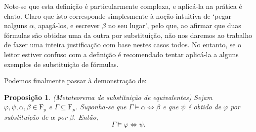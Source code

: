 \documentclass{report}
\newtheorem{prop}{Proposição}
\theoremstyle{definition}
\theoremstyle{remark}
\newcommand{\F}{\mathrm{F}}
\newcommand{\eqv}{\mathbin{\Leftrightarrow}}
\begin{document}
	Note-se que esta definição é particularmente complexa, e aplicá-la na prática é chato. Claro que isto corresponde simplesmente à noção intuitiva de `pegar nalguns $\alpha$, apagá-los, e escrever $\beta$ no seu lugar', pelo que, ao afirmar que duas fórmulas são obtidas uma da outra por substituição, não nos daremos ao trabalho de fazer uma inteira justificação com base nestes casos todos. No entanto, se o leitor estiver confuso com a definição é recomendado tentar aplicá-la a alguns exemplos de substituição de fórmulas.
	
	Podemos finalmente passar à demonstração de:
	
	\begin{prop}
	(Metateorema de substituição de equivalentes) Sejam $\varphi, \psi, \alpha, \beta \in \F_p$ e $\Gamma \subseteq \F_p$. Suponha-se que $\Gamma \vDash \alpha \eqv \beta$ e que $\psi$ é obtido de $\varphi$ por substituição de $\alpha$ por $\beta$. Então,
	\[\Gamma \vDash \varphi \eqv \psi.\]
	\end{prop}
	
\end{document}
